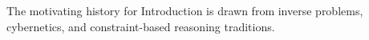 The motivating history for Introduction is drawn from inverse problems, cybernetics, and constraint-based reasoning traditions.
